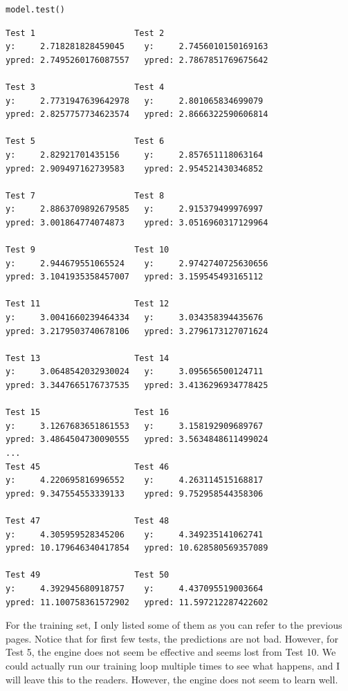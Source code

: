 \documentclass[../../main.tex]{subfiles}
\begin{document}
\begin{jupyter}
\begin{lstlisting}[style=jin]
model.test()
\end{lstlisting}
\begin{lstlisting}[style=jout]
Test 1                    Test 2
y:     2.718281828459045    y:     2.7456010150169163
ypred: 2.7495260176087557   ypred: 2.7867851769675642

Test 3                    Test 4
y:     2.7731947639642978   y:     2.801065834699079
ypred: 2.8257757734623574   ypred: 2.8666322590606814

Test 5                    Test 6
y:     2.82921701435156     y:     2.857651118063164
ypred: 2.909497162739583    ypred: 2.954521430346852

Test 7                    Test 8
y:     2.8863709892679585   y:     2.915379499976997
ypred: 3.001864774074873    ypred: 3.0516960317129964

Test 9                    Test 10
y:     2.944679551065524    y:     2.9742740725630656
ypred: 3.1041935358457007   ypred: 3.159545493165112

Test 11                   Test 12
y:     3.0041660239464334   y:     3.034358394435676
ypred: 3.2179503740678106   ypred: 3.2796173127071624

Test 13                   Test 14
y:     3.0648542032930024   y:     3.095656500124711
ypred: 3.3447665176737535   ypred: 3.4136296934778425

Test 15                   Test 16
y:     3.1267683651861553   y:     3.158192909689767
ypred: 3.4864504730090555   ypred: 3.5634848611499024
...
Test 45                   Test 46
y:     4.220695816996552    y:     4.263114515168817
ypred: 9.347554553339133    ypred: 9.752958544358306

Test 47                   Test 48
y:     4.305959528345206    y:     4.349235141062741
ypred: 10.179646340417854   ypred: 10.628580569357089

Test 49                   Test 50
y:     4.392945680918757    y:     4.437095519003664
ypred: 11.100758361572902   ypred: 11.597212287422602
\end{lstlisting}
\end{jupyter}

For the training set, I only listed some of them as you can
refer to the previous pages. Notice that for first few tests,
the predictions are not bad. However, for Test 5, the engine
does not seem be effective and seems lost from Test 10.
We could actually run our training loop multiple times to see
what happens, and I will leave this to the readers. However,
the engine does not seem to learn well.
\end{document}
